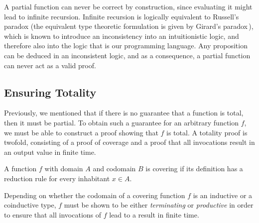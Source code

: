 A partial function can never be correct by construction, since evaluating it
might lead to infinite recursion. Infinite recursion is logically equivalent to
Russell's paradox (the equivalent type theoretic formulation is given by
Girard's paradox\,\citep{Girard1972}), which is known to introduce an inconsistency into an
intuitionistic logic, and therefore also into the logic that is our programming
language. Any proposition can be deduced in an inconsistent logic, and as a
consequence, a partial function can never act as a valid proof.


\subsection{Ensuring Totality}
Previously, we mentioned that if there is no guarantee that a function is total,
then it must be partial. To obtain such a guarantee for an arbitrary function
$f$, we must be able to construct a proof showing that $f$ is total. A totality
proof is twofold, consisting of a proof of coverage and a proof that all
invocations result in an output value in finite time.

\begin{definition}
  A function $f$ with domain $A$ and codomain $B$ is covering if its definition
  has a reduction rule for every inhabitant $x\in A$.
\end{definition}

Depending on whether the codomain of a covering function $f$ is an inductive or
a coinductive type, $f$ must be shown to be either \emph{terminating} or
\emph{productive} in order to ensure that all invocations of $f$ lead to a
result in finite time.

